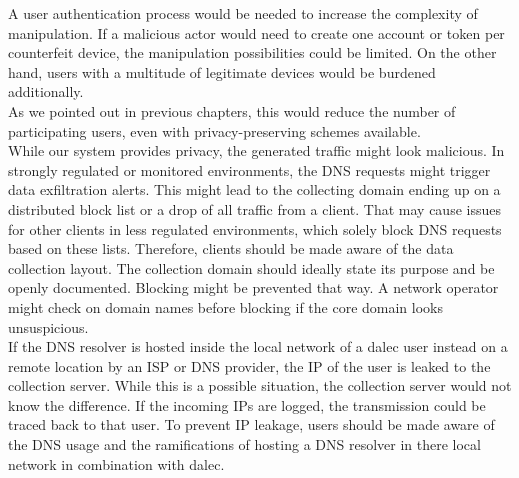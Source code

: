     A user authentication process would be needed to increase the complexity of manipulation. If a malicious actor would need to create one account or token per counterfeit device, the manipulation possibilities could be limited. On the other hand, users with a multitude of legitimate devices would be burdened additionally.\\ 
    As we pointed out in previous chapters, this would reduce the number of participating users, even with privacy-preserving schemes available.\\

    While our system provides privacy, the generated traffic might look malicious.
    In strongly regulated or monitored environments, the DNS requests might trigger data exfiltration alerts. This might lead to the collecting domain ending up on a distributed block list or a drop of all traffic from a client. That may cause issues for other clients in less regulated environments, which solely block DNS requests based on these lists.
    Therefore, clients should be made aware of the data collection layout. The collection domain should ideally state its purpose and be openly documented. Blocking might be prevented that way. A network operator might check on domain names before blocking if the core domain looks unsuspicious.\\
    
    If the DNS resolver is hosted inside the local network of a dalec user instead on a remote location by an ISP or DNS provider, the IP of the user is leaked to the collection server. While this is a possible situation, the collection server would not know the difference. If the incoming IPs are logged, the transmission could be traced back to that user. To prevent IP leakage, users should be made aware of the DNS usage and the ramifications of hosting a DNS resolver in there local network in combination with dalec.\\

